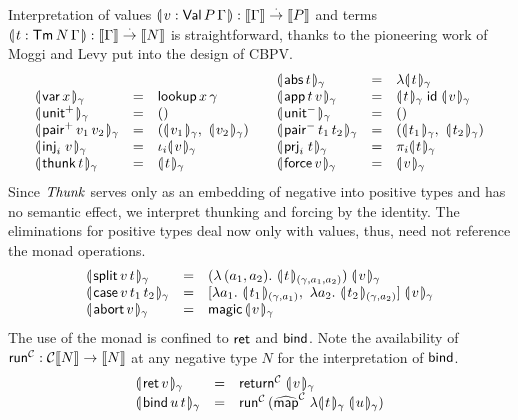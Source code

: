 \documentclass[sigplan,screen]{acmart}
\begin{document}
Interpretation of values
$\denty{ v : \PValTm P \Gamma } : \den \Gamma \todot \den P$
and terms
$\denty{ t : \Tm N \Gamma } : \den \Gamma \todot \den N$
is straightforward, thanks to the pioneering work of
Moggi \cite{moggi:infcomp91} and
Levy \cite{levy:hosc06}
put into the design of CBPV.
\[
\begin{array}{lcl}
  \\
  \dent{\tvar\,x}\gamma & = & \tlookup\,x\,\gamma \\
  \dent{\punit}\gamma   & = & \ttempty \\
  \dent{\ppair\,v_1\,v_2}\gamma & = &
    (\dent{v_1}\gamma,\ \dent{v_2}\gamma) \\
  \dent{\inj i v}\gamma & = & \iota_i \dent v \gamma \\
  \dent{\tthunk\,t}\gamma & = & \dent t \gamma \\
\end{array}
\quad
\begin{array}{lcl}
  \dent{\tabs\,t}\gamma
      & = & \fdent t \gamma \\
  \dent{\tapp\,t\,v} \gamma & = &
     \dent t \gamma\;\tid\;\dent v \gamma \\
  \dent{\nunit}\gamma & = & \ttempty \\
  \dent{\npair\,t_1\,t_2}\gamma & = &
    (\dent{t_1}\gamma,\ \dent{t_2}\gamma) \\
  \dent{\prj i t}\gamma & = & \pi_i \dent t \gamma \\
  \dent{\tforce\,v}\gamma & = & \dent v \gamma \\
\end{array}
\]
Since $\tThunk$ serves only as an embedding of negative into positive
types and has no semantic effect,
we interpret thunking and forcing by the identity.
The eliminations for positive types deal now only with values, thus,
need not reference the monad operations.
\[
\begin{array}{lcl}
  \dent{\tsplit\,v\,t}\gamma & = & (\lambda\,(a_1,a_2).\
    \dent{t}{(\gamma,a_1,a_2)} ) \; \dent v \gamma \\
  \dent{\tcase\,v\,t_1\,t_2}\gamma & = &
    [  \lambda a_1.\ \dent{t_1}{(\gamma,a_1)}
    ,\ \lambda a_2.\ \dent{t_2}{(\gamma,a_2)}
    ]\; \dent v \gamma \\
  \dent{\tabort\,v}\gamma & = & \tmagic\,\dent v \gamma \\
\end{array}
\]
The use of the monad is confined to $\tret$ and $\tbind$.
Note the availability of $\trun^\C : \C \den N \to \den N$
at any negative type $N$ for the interpretation of $\tbind$.
\[
\begin{array}{lcl}
  \dent{\tret\,v}\gamma & = & \treturn[\C] \; \dent v \gamma \\
  \dent{\tbind\,u\,t}\gamma & = & \trun^\C\,
    (\stmap[\C] \; \fdent t \gamma\; \dent u \gamma) \\
\end{array}
\]
\end{document}
